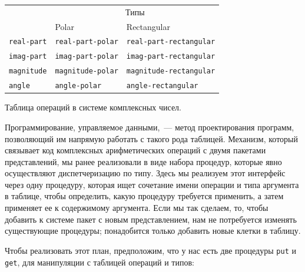 \begin{cntrfig}
\begin{tabular}{|l|l|l|}
\hline
  & \multicolumn{2}{c|}{Типы} \\ \cline{2-3}
\raisebox{7pt}{Операции} & Polar & Rectangular \\ \hline
{\tt real-part} & {\tt real-part-polar} \qquad & {\tt real-part-rectangular} \\
{\tt imag-part} & {\tt imag-part-polar} & {\tt imag-part-rectangular} \\
{\tt magnitude} & {\tt magnitude-polar} & {\tt magnitude-rectangular} \\
{\tt angle}     & {\tt angle-polar}     & {\tt angle-rectangular}\\
\hline
\end{tabular}

\caption{
Таблица операций в системе комплексных чисел.}
\label{F2.22}

\end{cntrfig}

Программирование, управляемое данными,~--- метод
проектирования программ, позволяющий им напрямую работать с такого рода
таблицей.  Механизм, который связывает код
комплексных арифметических операций с двумя пакетами представлений, мы 
ранее реализовали в
виде набора процедур, которые явно осуществляют диспетчеризацию по
типу.  Здесь мы реализуем этот интерфейс через одну процедуру, которая
ищет сочетание имени операции и типа аргумента в таблице, чтобы
определить, какую процедуру требуется применить, а затем применяет ее
к содержимому аргумента.  Если мы так сделаем, то, чтобы добавить к
системе пакет с новым представлением, нам не потребуется изменять
существующие процедуры; понадобится только добавить новые клетки в
таблицу.

Чтобы реализовать этот план, предположим, что у нас есть
две процедуры {\tt put} и {\tt get}, для манипуляции с
таблицей операций и типов:

